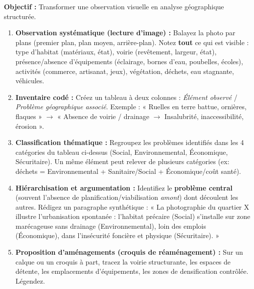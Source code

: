 \documentclass[11pt]{article}
\begin{document}
\begin{methode}
\textbf{Objectif :} Transformer une observation visuelle en analyse géographique structurée.
\begin{enumerate}
    \item \textbf{Observation systématique (lecture d'image) :} Balayez la photo par plans (premier plan, plan moyen, arrière-plan). Notez \textbf{tout} ce qui est visible : type d'habitat (matériaux, état), voirie (revêtement, largeur, état), présence/absence d'équipements (éclairage, bornes d'eau, poubelles, écoles), activités (commerce, artisanat, jeux), végétation, déchets, eau stagnante, véhicules.
    \item \textbf{Inventaire codé :} Créez un tableau à deux colonnes : \textit{Élément observé} / \textit{Problème géographique associé}. Exemple : « Ruelles en terre battue, ornières, flaques » $\rightarrow$ « Absence de voirie / drainage $\rightarrow$ Insalubrité, inaccessibilité, érosion ».
    \item \textbf{Classification thématique :} Regroupez les problèmes identifiés dans les 4 catégories du tableau ci-dessus (Social, Environnemental, Économique, Sécuritaire). Un même élément peut relever de plusieurs catégories (ex: déchets = Environnemental + Sanitaire/Social + Économique/coût santé).
    \item \textbf{Hiérarchisation et argumentation :} Identifiez le \textbf{problème central} (souvent l'absence de planification/viabilisation \emph{amont}) dont découlent les autres. Rédigez un paragraphe synthétique : « La photographie du quartier X illustre l'urbanisation spontanée : l'habitat précaire (Social) s'installe sur zone marécageuse sans drainage (Environnemental), loin des emplois (Économique), dans l'insécurité foncière et physique (Sécuritaire). »
    \item \textbf{Proposition d'aménagements (croquis de réaménagement) :} Sur un calque ou un croquis à part, tracez la voirie structurante, les espaces de détente, les emplacements d'équipements, les zones de densification contrôlée. Légendez.
\end{enumerate}
\end{methode}
\end{document}
